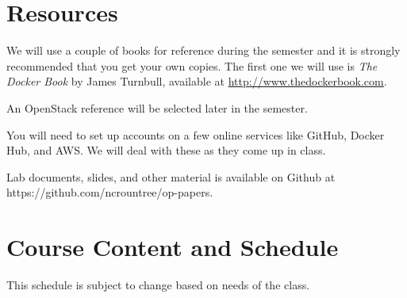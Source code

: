 \documentclass{article}
\begin{document}
\section*{Resources}
We will use a couple of books for reference during the semester and it is strongly recommended that you get your own copies.  The first one we will use is \emph{The Docker Book} by James Turnbull, available at \url{http://www.thedockerbook.com}.

An OpenStack reference will be selected later in the semester.

You will need to set up accounts on a few online services like GitHub, Docker Hub, and AWS.  We will deal with these as they come up in class.

Lab documents, slides, and other material is available on Github at https://github.com/ncrountree/op-papers.

\newpage 

\section*{Course Content and Schedule}
This schedule is subject to change based on needs of the class.
\end{document}
